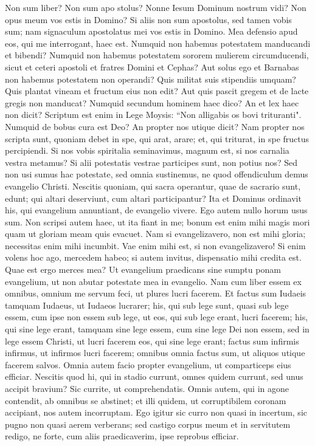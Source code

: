 \begin{biblechapter} 
\verse Non sum liber? Non sum apo stolus? Nonne Iesum Dominum nostrum vidi? Non opus meum vos estis in Domino? 
\verse Si aliis non sum apostolus, sed tamen vobis sum; nam signaculum apostolatus mei vos estis in Domino. 
\verse Mea defensio apud eos, qui me interrogant, haec est. 
\verse Numquid non habemus potestatem manducandi et bibendi? 
\verse Numquid non habemus potestatem sororem mulierem circumducendi, sicut et ceteri apostoli et fratres Domini et Cephas? 
\verse Aut solus ego et Barnabas non habemus potestatem non operandi? 
\verse Quis militat suis stipendiis umquam? Quis plantat vineam et fructum eius non edit? Aut quis pascit gregem et de lacte gregis non manducat? 
\verse Numquid secundum hominem haec dico? An et lex haec non dicit? 
\verse Scriptum est enim in Lege Moysis: “Non alligabis os bovi trituranti". Numquid de bobus cura est Deo? 
\verse An propter nos utique dicit? Nam propter nos scripta sunt, quoniam debet in spe, qui arat, arare; et, qui triturat, in spe fructus percipiendi.  
\verse Si nos vobis spiritalia seminavimus, magnum est, si nos carnalia vestra metamus? 
\verse Si alii potestatis vestrae participes sunt, non potius nos? Sed non usi sumus hac potestate, sed omnia sustinemus, ne quod offendiculum demus evangelio Christi. 
\verse Nescitis quoniam, qui sacra operantur, quae de sacrario sunt, edunt; qui altari deserviunt, cum altari participantur? 
\verse Ita et Dominus ordinavit his, qui evangelium annuntiant, de evangelio vivere. 
\verse Ego autem nullo horum usus sum. Non scripsi autem haec, ut ita fiant in me; bonum est enim mihi magis mori quam ut gloriam meam quis evacuet. 
\verse Nam si evangelizavero, non est mihi gloria; necessitas enim mihi incumbit. Vae enim mihi est, si non evangelizavero! 
\verse Si enim volens hoc ago, mercedem habeo; si autem invitus, dispensatio mihi credita est. 
\verse Quae est ergo merces mea? Ut evangelium praedicans sine sumptu ponam evangelium, ut non abutar potestate mea in evangelio. 
\verse Nam cum liber essem ex omnibus, omnium me servum feci, ut plures lucri facerem. 
\verse Et factus sum Iudaeis tamquam Iudaeus, ut Iudaeos lucrarer; his, qui sub lege sunt, quasi sub lege essem, cum ipse non essem sub lege, ut eos, qui sub lege erant, lucri facerem; 
\verse his, qui sine lege erant, tamquam sine lege essem, cum sine lege Dei non essem, sed in lege essem Christi, ut lucri facerem eos, qui sine lege erant; 
\verse factus sum infirmis infirmus, ut infirmos lucri facerem; omnibus omnia factus sum, ut aliquos utique facerem salvos. 
\verse Omnia autem facio propter evangelium, ut comparticeps eius efficiar. 
\verse Nescitis quod hi, qui in stadio currunt, omnes quidem currunt, sed unus accipit bravium? Sic currite, ut comprehendatis. 
\verse Omnis autem, qui in agone contendit, ab omnibus se abstinet; et illi quidem, ut corruptibilem coronam accipiant, nos autem incorruptam. 
\verse Ego igitur sic curro non quasi in incertum, sic pugno non quasi aerem verberans; 
\verse sed castigo corpus meum et in servitutem redigo, ne forte, cum aliis praedicaverim, ipse reprobus efficiar. 
\end{biblechapter}


